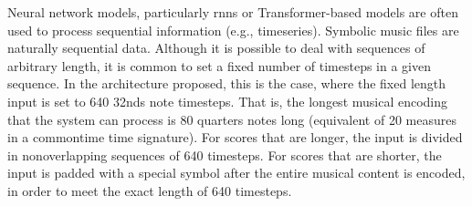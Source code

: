 
Neural network models, particularly \glspl{rnn} or
Transformer-based models are often used to process
sequential information (e.g., timeseries). Symbolic music
files are naturally sequential data. Although it is possible
to deal with sequences of arbitrary length, it is common to
set a fixed number of timesteps in a given sequence. In the
architecture proposed, this is the case, where the fixed
length input is set to 640 \glspl{32nd} note timesteps. That
is, the longest musical encoding that the system can process
is 80 \glspl{quarter} notes long (equivalent of 20 measures in
a \gls{commontime} time signature). For scores that are
longer, the input is divided in nonoverlapping sequences of
640 timesteps. For scores that are shorter, the input is
padded with a special symbol after the entire musical
content is encoded, in order to meet the exact length of 640
timesteps.
